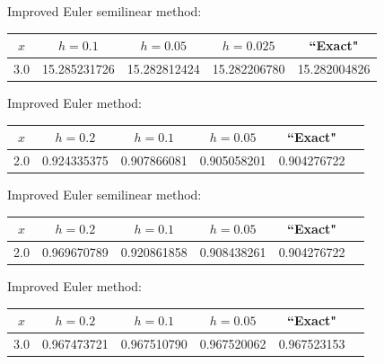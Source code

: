 \bigskip

\hspace{.75in}
{\small Improved Euler semilinear method:
\begin{tabular}{|c|r|r|r|r|}
\hline
\multicolumn{1}{|c|}{$x$}&
\multicolumn{1}{|c|}{$h=0.1$}&
\multicolumn{1}{|c|}{$h=0.05$}&
\multicolumn{1}{|c|}{$h=0.025$}&
\multicolumn{1}{|c|}{``Exact"}\\ \hline
3.0 & 15.285231726 & 15.282812424 & 15.282206780 & 15.282004826 \\
\hline
\end{tabular}}

\bigskip

{\small Improved Euler method:
\begin{tabular}{|c|r|r|r|r|r|}
\hline
\multicolumn{1}{|c|}{$x$}&
\multicolumn{1}{|c|}{$h=0.2$}&
\multicolumn{1}{|c|}{$h=0.1$}&
\multicolumn{1}{|c|}{$h=0.05$}&
\multicolumn{1}{|c|}{``Exact"}\\ \hline
2.0 & 0.924335375 & 0.907866081 & 0.905058201 & 0.904276722 \\
\hline
\end{tabular}}

\bigskip

\hspace{.75in}
{\small Improved Euler semilinear method:
\begin{tabular}{|c|r|r|r|r|r|}
\hline
\multicolumn{1}{|c|}{$x$}&
\multicolumn{1}{|c|}{$h=0.2$}&
\multicolumn{1}{|c|}{$h=0.1$}&
\multicolumn{1}{|c|}{$h=0.05$}&
\multicolumn{1}{|c|}{``Exact"}\\ \hline
2.0 & 0.969670789 & 0.920861858 & 0.908438261 & 0.904276722 \\
\hline
\end{tabular}}

\bigskip

{\small Improved Euler method:
\begin{tabular}{|c|r|r|r|r|r|}
\hline
\multicolumn{1}{|c|}{$x$}&
\multicolumn{1}{|c|}{$h=0.2$}&
\multicolumn{1}{|c|}{$h=0.1$}&
\multicolumn{1}{|c|}{$h=0.05$}&
\multicolumn{1}{|c|}{``Exact"}\\ \hline
3.0 & 0.967473721 & 0.967510790 & 0.967520062 & 0.967523153 \\
\hline
\end{tabular}}

\bigskip


